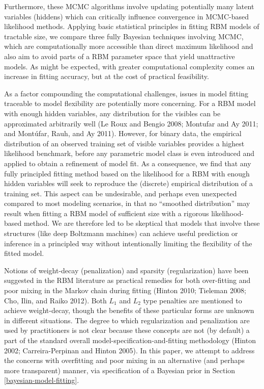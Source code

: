\documentclass[AMS,STIX1COL]{WileyNJD-v2}
\begin{document}
Furthermore, these MCMC algorithms involve updating potentially many
latent variables (hiddens) which can critically influence convergence in
MCMC-based likelihood methods. Applying basic statistical principles in
fitting RBM models of tractable size, we compare three fully Bayesian
techniques involving MCMC, which are computationally more accessible
than direct maximum likelihood and also aim to avoid parts of a RBM
parameter space that yield unattractive models. As might be expected,
with greater computational complexity comes an increase in fitting
accuracy, but at the cost of practical feasibility.

As a factor compounding the computational challenges, issues in model
fitting traceable to model flexibility are potentially more concerning.
For a RBM model with enough hidden variables, any distribution for the
visibles can be approximated arbitrarily well (Le Roux and Bengio 2008;
Montufar and Ay 2011; and Montúfar, Rauh, and Ay 2011). However, for
binary data, the empirical distribution of an observed training set of
visible variables provides a highest likelihood benchmark, before any
parametric model class is even introduced and applied to obtain a
refinement of model fit. As a consequence, we find that any fully
principled fitting method based on the likelihood for a RBM with enough
hidden variables will seek to reproduce the (discrete) empirical
distribution of a training set. This aspect can be undesirable, and
perhaps even unexpected compared to most modeling scenarios, in that no
``smoothed distribution'' may result when fitting a RBM model of
sufficient size with a rigorous likelihood-based method. We are
therefore led to be skeptical that models that involve these structures
(like deep Boltzmann machines) can achieve useful prediction or
inference in a principled way without intentionally limiting the
flexibility of the fitted model.

Notions of weight-decay (penalization) and sparsity (regularization)
have been suggested in the RBM literature as practical remedies for both
over-fitting and poor mixing in the Markov chain during fitting (Hinton
2010; Tieleman 2008; Cho, Ilin, and Raiko 2012). Both \(L_1\) and
\(L_2\) type penalties are mentioned to achieve weight-decay, though the
benefits of these particular forms are unknown in different situations.
The degree to which regularization and penalization are used by
practitioners is not clear because these concepts are not (by default) a
part of the standard overall model-specification-and-fitting methodology
(Hinton 2002; Carreira-Perpinan and Hinton 2005). In this paper, we
attempt to address the concerns with overfitting and poor mixing in an
alternative (and perhaps more transparent) manner, via specification of
a Bayesian prior in Section \ref{bayesian-model-fitting}.
\end{document}
